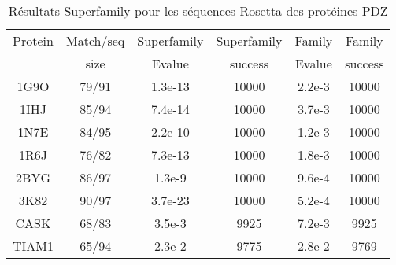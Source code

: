     \begin{table}[h]
           \raggedleft{}

      \begin{tabular}{cccccc}

        \toprule
        Protein & Match/seq & Superfamily & Superfamily & Family & Family \\
                & size      & Evalue      & success     & Evalue & success\\
        \cmidrule{1-6}
        1G9O  & 79/91   &    1.3e-13 & 10000 & 2.2e-3 & 10000 \\
        1IHJ  & 85/94   &    7.4e-14 & 10000 & 3.7e-3 & 10000 \\
        1N7E  & 84/95   &    2.2e-10 & 10000 & 1.2e-3 & 10000 \\
        1R6J  & 76/82   &    7.3e-13 & 10000 & 1.8e-3 & 10000 \\
        2BYG  & 86/97   &    1.3e-9  & 10000 & 9.6e-4 & 10000 \\
        3K82  & 90/97   &    3.7e-23 & 10000 & 5.2e-4 & 10000 \\
        CASK  & 68/83   &    3.5e-3  &  9925 & 7.2e-3 &  9925 \\
        TIAM1 & 65/94   &    2.3e-2  &  9775 & 2.8e-2 &  9769 \\
        \bottomrule        
      \end{tabular}   
     \caption{Résultats Superfamily pour les séquences Rosetta des  protéines PDZ}   
\label{tab:superfamily_bestRE}       
\end{table}




